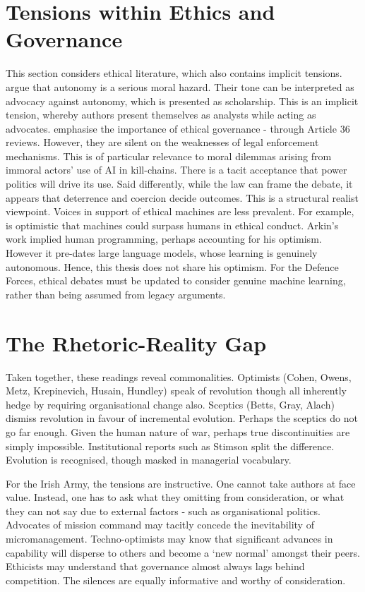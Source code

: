 \section{Tensions within Ethics and Governance}
This section considers ethical literature, which also contains implicit tensions. \textcite{SINGER_2010,SPARROW_2016} argue that autonomy is a serious moral hazard. Their tone can be interpreted as advocacy against autonomy, which is presented as scholarship. This is an implicit tension, whereby authors present themselves as analysts while acting as advocates.\textcite{SAUER_2020,ALTMANN_2017} emphasise the importance of ethical governance - through Article 36 reviews. However, they are silent on the weaknesses of legal enforcement mechanisms. This is of particular relevance to moral dilemmas arising from immoral actors' use of AI in kill-chains. There is a tacit acceptance that  power politics will drive its use. Said differently, while the law can frame the debate, it appears that deterrence and coercion decide outcomes. This is a structural realist viewpoint. Voices in support of ethical machines are less prevalent. For example, \textcite{ARKIN_2008} is optimistic that machines could surpass humans in ethical conduct. Arkin's work implied human programming, perhaps accounting for his optimism. However it pre-dates large language models, whose learning is genuinely autonomous. Hence, this thesis does not share his optimism. For the Defence Forces, ethical debates must be updated to consider genuine machine learning, rather than being assumed from legacy arguments.

\section{The Rhetoric-Reality Gap}
Taken together, these readings reveal commonalities. Optimists (Cohen, Owens, Metz, Krepinevich, Husain, Hundley) speak of revolution though all inherently hedge by requiring organisational change also. Sceptics (Betts, Gray, Alach) dismiss revolution in favour of incremental evolution. Perhaps the sceptics do not go far enough. Given the human nature of war, perhaps true discontinuities are simply impossible. Institutional reports such as Stimson \nocite{STIMSON_2015} split the difference. Evolution is recognised, though masked in managerial vocabulary. 

For the Irish Army, the tensions are instructive. One cannot take authors at face value. Instead, one has to ask what they omitting from consideration, or what they can not say due to external factors - such as organisational politics. Advocates of mission command may tacitly concede the inevitability of micromanagement. Techno-optimists may know that significant advances in capability will disperse to others and become a `new normal' amongst their peers. Ethicists may understand that governance almost always lags behind competition. The silences are equally informative and worthy of consideration. 



